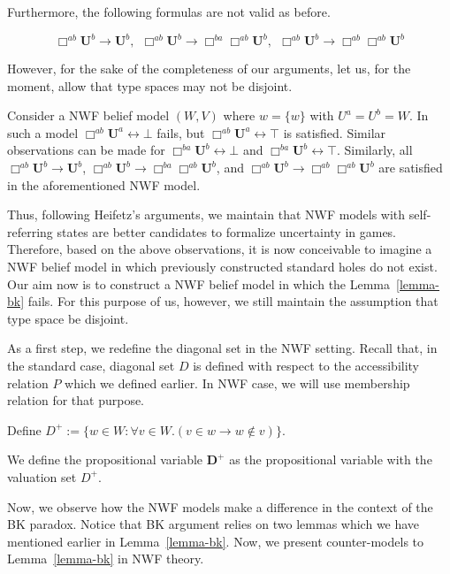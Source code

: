 \documentclass{article}
\begin{document}
Furthermore, the following formulas are not valid as before.

$$\Box^{ab} \mathbf{U}^b \rightarrow \mathbf{U}^b,~~ \Box^{ab} \mathbf{U}^b \rightarrow \Box^{ba} \Box^{ab} \mathbf{U}^b,~~ \Box^{ab} \mathbf{U}^b \rightarrow \Box^{ab} \Box^{ab} \mathbf{U}^b$$

However, for the sake of the completeness of our arguments, let us, for the moment, allow that type spaces may not be disjoint.

Consider a NWF belief model $(W, V)$ where $w = \{ w \}$ with $U^a = U^b = W$. In such a model $\Box^{ab}\mathbf{U}^a \leftrightarrow \bot$ fails, but    $\Box^{ab}\mathbf{U}^a \leftrightarrow \top$ is satisfied. Similar observations can be made for $\Box^{ba}\mathbf{U}^b \leftrightarrow \bot$ and $\Box^{ba}\mathbf{U}^b \leftrightarrow \top$. Similarly, all $\Box^{ab} \mathbf{U}^b \rightarrow \mathbf{U}^b$, $\Box^{ab} \mathbf{U}^b \rightarrow \Box^{ba} \Box^{ab} \mathbf{U}^b$, and $\Box^{ab} \mathbf{U}^b \rightarrow \Box^{ab} \Box^{ab} \mathbf{U}^b$ are satisfied in the aforementioned NWF model. 

Thus, following Heifetz's arguments, we maintain that NWF models with self-referring states are better candidates to formalize uncertainty in games. Therefore, based on the above observations, it is now conceivable to imagine a NWF belief model in which previously constructed standard holes do not exist. Our aim now is to construct a NWF belief model in which the Lemma~\ref{lemma-bk} fails. For this purpose of us, however, we still maintain the assumption that type space be disjoint.

As a first step, we redefine the diagonal set in the NWF setting. Recall that, in the standard case, diagonal set $D$ is defined with respect to the accessibility relation $P$ which we defined earlier.  In NWF case, we will use membership relation for that purpose.

\begin{dfn}
Define $D^+ := \{ w \in W : \forall v \in W . (v \in w \rightarrow w \notin v) \}$. 
\end{dfn}

We define the propositional variable $\mathbf{D}^+$ as the propositional variable with the valuation set $D^+$. 

Now, we observe how the NWF models make a difference in the context of the BK paradox. Notice that BK argument relies on two lemmas which we have mentioned earlier in Lemma~\ref{lemma-bk}. Now, we present counter-models to Lemma~\ref{lemma-bk} in NWF theory.
\end{document}
